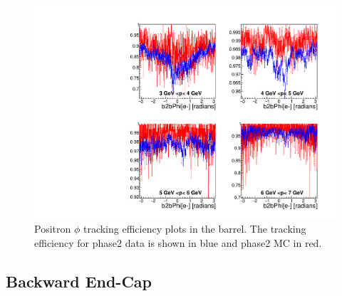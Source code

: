\documentclass[a4paper,11pt,twosided,final,german,openbib,pdftex,listof=totoc,bibliography=totoc]{scrbook}
\begin{document}
\begin{figure}[!htbp]
	\centering
	\includegraphics[width=\textwidth]{Plots/master/xPMPhiepBarrel}
	\caption[Momentum $\phi$ Positron Barrel Efficiency Phase2]{Positron $\phi$ tracking efficiency plots in the barrel. The tracking efficiency for phase2 data is shown in blue and phase2 MC in red.}
		\label{plt:xPMPhiepBarrel}
\end{figure}

\newpage
\subsection{Backward End-Cap}
\label{sec:MEC}
\end{document}
